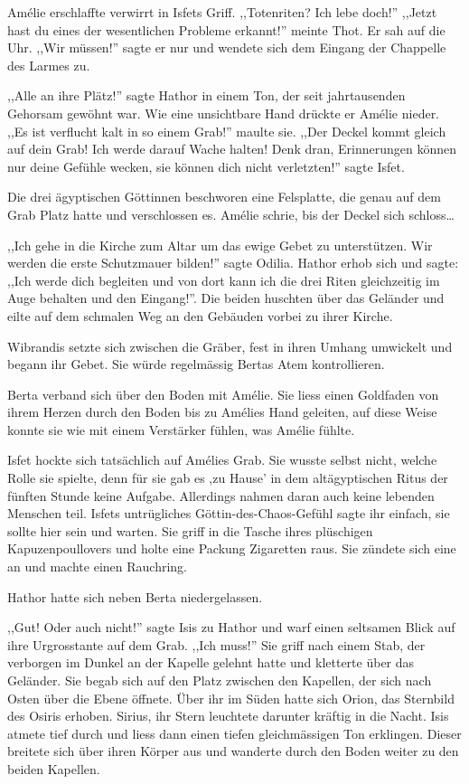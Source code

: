 \documentclass[11pt,titlepage,a5paper]{book}
\begin{document}
Amélie erschlaffte verwirrt in Isfets Griff. ,,Totenriten? Ich lebe doch!'' ,,Jetzt hast du eines der wesentlichen Probleme erkannt!'' meinte Thot. Er sah auf die Uhr. ,,Wir müssen!'' sagte er nur und wendete sich dem Eingang der Chappelle des Larmes zu.

,,Alle an ihre Plätz!'' sagte Hathor in einem Ton, der seit jahrtausenden Gehorsam gewöhnt war. Wie eine unsichtbare Hand drückte er Amélie nieder. ,,Es ist verflucht kalt in so einem Grab!'' maulte sie. ,,Der Deckel kommt gleich auf dein Grab! Ich werde darauf Wache halten! Denk dran, Erinnerungen können nur deine Gefühle wecken, sie können dich nicht verletzten!'' sagte Isfet. 

Die drei ägyptischen Göttinnen beschworen eine Felsplatte, die genau auf dem Grab Platz hatte und verschlossen es. Amélie schrie, bis der Deckel sich schloss\dots

,,Ich gehe in die Kirche zum Altar um das ewige Gebet zu unterstützen. Wir werden die erste Schutzmauer bilden!'' sagte Odilia. Hathor erhob sich und sagte: ,,Ich werde dich begleiten und von dort kann ich die drei Riten gleichzeitig im Auge behalten und den Eingang!''. Die beiden huschten über das Geländer und eilte auf dem schmalen Weg an den Gebäuden vorbei zu ihrer Kirche.

Wibrandis setzte sich zwischen die Gräber, fest in ihren Umhang umwickelt und begann ihr Gebet. Sie würde regelmässig Bertas Atem kontrollieren.

Berta verband sich über den Boden mit Amélie. Sie liess einen Goldfaden von ihrem Herzen durch den Boden bis zu Amélies Hand geleiten, auf diese Weise konnte sie wie mit einem Verstärker fühlen, was Amélie fühlte.

Isfet hockte sich tatsächlich auf Amélies Grab. Sie wusste selbst nicht, welche Rolle sie spielte, denn für sie gab es ,zu Hause' in dem altägyptischen Ritus der fünften Stunde keine Aufgabe. Allerdings nahmen daran auch keine lebenden Menschen teil. Isfets untrügliches Göttin-des-Chaos-Gefühl sagte ihr einfach, sie sollte hier sein und warten. Sie griff in die Tasche ihres plüschigen Kapuzenpoullovers und holte eine Packung Zigaretten raus. Sie zündete sich eine an und machte einen Rauchring. 

Hathor hatte sich neben Berta niedergelassen.

,,Gut! Oder auch nicht!'' sagte Isis zu Hathor und warf einen seltsamen Blick auf ihre Urgrosstante auf dem Grab. ,,Ich muss!'' Sie griff nach einem Stab, der verborgen im Dunkel an der Kapelle gelehnt hatte und kletterte über das Geländer. Sie begab sich auf den Platz zwischen den Kapellen, der sich nach Osten über die Ebene öffnete. Über ihr im Süden hatte sich Orion, das Sternbild des Osiris erhoben. Sirius, ihr Stern leuchtete darunter kräftig in die Nacht. Isis atmete tief durch und liess dann einen tiefen gleichmässigen Ton erklingen. Dieser breitete sich über ihren Körper aus und wanderte durch den Boden weiter zu den beiden Kapellen.
\end{document}
